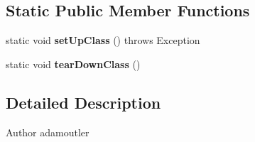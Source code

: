 \subsection*{Static Public Member Functions}
\begin{DoxyCompactItemize}
\item 
\hypertarget{classCASUAL_1_1archiving_1_1libpit_1_1PitDataTest_ae6d0c9b6d0d8d4552a617d27cf19f03f}{static void {\bfseries set\-Up\-Class} ()  throws Exception }\label{classCASUAL_1_1archiving_1_1libpit_1_1PitDataTest_ae6d0c9b6d0d8d4552a617d27cf19f03f}

\item 
\hypertarget{classCASUAL_1_1archiving_1_1libpit_1_1PitDataTest_afc8660df7ded0c765b2f1e52a97e8dae}{static void {\bfseries tear\-Down\-Class} ()}\label{classCASUAL_1_1archiving_1_1libpit_1_1PitDataTest_afc8660df7ded0c765b2f1e52a97e8dae}

\end{DoxyCompactItemize}


\subsection{Detailed Description}
\begin{DoxyAuthor}{Author}
adamoutler 
\end{DoxyAuthor}


